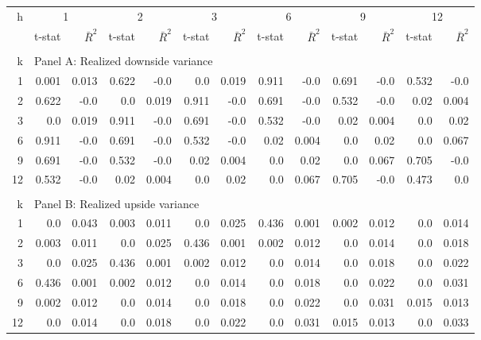 \documentclass{article}
\begin{document}
\begin{center}
\hspace*{-3cm}
\begin{tabular}{@{\extracolsep{6pt}}rrrrrrrrrrrrr@{}}

\hline

h & \multicolumn{2}{c}{1} & \multicolumn{2}{c}{2} & \multicolumn{2}{c}{3} & \multicolumn{2}{c}{6} & \multicolumn{2}{c}{9} & \multicolumn{2}{c}{12} \\[6pt]

\cline{2-3} \cline{4-5} \cline{6-7} \cline{8-9} \cline{10-11} \cline{12-13}

 & t-stat & $\bar{R}^{2}$ & t-stat & $\bar{R}^{2}$ &  t-stat & $\bar{R}^{2}$ &  
 t-stat & $\bar{R}^{2}$ &  t-stat & $\bar{R}^{2}$ &  t-stat & $\bar{R}^{2}$ \\[6pt]
 
\hline\\[0.000000001pt]

k & \multicolumn{12}{l}{Panel A: Realized downside variance} \\[7pt]

\hline

1 & 0.001 & 0.013 & 0.622 & -0.0 & 0.0 & 0.019 & 0.911 & -0.0 & 0.691 & -0.0 & 0.532 & -0.0 \\[6pt]
2 & 0.622 & -0.0 & 0.0 & 0.019 & 0.911 & -0.0 & 0.691 & -0.0 & 0.532 & -0.0 & 0.02 & 0.004 \\[6pt]
3 & 0.0 & 0.019 & 0.911 & -0.0 & 0.691 & -0.0 & 0.532 & -0.0 & 0.02 & 0.004 & 0.0 & 0.02 \\[6pt]
6 & 0.911 & -0.0 & 0.691 & -0.0 & 0.532 & -0.0 & 0.02 & 0.004 & 0.0 & 0.02 & 0.0 & 0.067 \\[6pt]
9 & 0.691 & -0.0 & 0.532 & -0.0 & 0.02 & 0.004 & 0.0 & 0.02 & 0.0 & 0.067 & 0.705 & -0.0 \\[6pt]
12 & 0.532 & -0.0 & 0.02 & 0.004 & 0.0 & 0.02 & 0.0 & 0.067 & 0.705 & -0.0 & 0.473 & 0.0 \\[6pt]

\hline\\[0.000000001pt]

k & \multicolumn{12}{l}{Panel B: Realized upside variance} \\[7pt]

\hline

1 & 0.0 & 0.043 & 0.003 & 0.011 & 0.0 & 0.025 & 0.436 & 0.001 & 0.002 & 0.012 & 0.0 & 0.014 \\[6pt]
2 & 0.003 & 0.011 & 0.0 & 0.025 & 0.436 & 0.001 & 0.002 & 0.012 & 0.0 & 0.014 & 0.0 & 0.018 \\[6pt]
3 & 0.0 & 0.025 & 0.436 & 0.001 & 0.002 & 0.012 & 0.0 & 0.014 & 0.0 & 0.018 & 0.0 & 0.022 \\[6pt]
6 & 0.436 & 0.001 & 0.002 & 0.012 & 0.0 & 0.014 & 0.0 & 0.018 & 0.0 & 0.022 & 0.0 & 0.031 \\[6pt]
9 & 0.002 & 0.012 & 0.0 & 0.014 & 0.0 & 0.018 & 0.0 & 0.022 & 0.0 & 0.031 & 0.015 & 0.013 \\[6pt]
12 & 0.0 & 0.014 & 0.0 & 0.018 & 0.0 & 0.022 & 0.0 & 0.031 & 0.015 & 0.013 & 0.0 & 0.033 \\[6pt]


\end{tabular}
\end{center}
\end{document}
